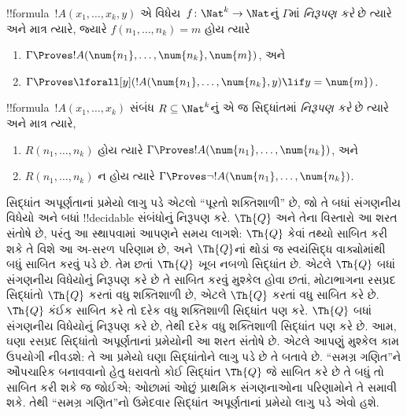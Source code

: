 \documentclass[../../../include/open-logic-section]{subfiles}
\begin{document}
\begin{defn}
!!{formula}~$!A(x_1, \dots, x_k, y)$ એ
વિધેય~$f\colon \Nat^k \to \Nat$નું
$\Gamma$માં \emph{નિરૂપણ કરે} છે
ત્યારે અને માત્ર ત્યારે, જ્યારે
$f(n_1, \dots, n_k)=m$ હોય ત્યારે
\begin{enumerate}
\item $\Gamma \Proves !A(\num{n_1}, \dots, \num{n_k}, \num{m})$, અને
\item $\Gamma \Proves \lforall[y](!A(\num{n_1}, \dots, \num{n_k},
y) \lif y = \num{m})$.
\end{enumerate}
\end{defn}

\begin{defn}
!!{formula}~$!A(x_1, \dots, x_k)$ સંબંધ
$R \subseteq \Nat^k$નું એ જ સિદ્ધાંતમાં
\emph{નિરૂપણ કરે}
છે ત્યારે અને માત્ર ત્યારે,
\begin{enumerate}
\item $R(n_1, \dots, n_k)$ હોય ત્યારે
  $\Gamma \Proves !A(\num{n_1},
\dots, \num{n_k})$, અને
\item $R(n_1, \dots, n_k)$ ન હોય ત્યારે
  $\Gamma \Proves \lnot
!A(\num{n_1}, \dots, \num{n_k})$.
\end{enumerate}
\end{defn}

સિદ્ધાંત અપૂર્ણતાનાં પ્રમેયો લાગુ પડે એટલો
``પૂરતો શક્તિશાળી'' છે, જો તે બધાં સંગણનીય
વિધેયો અને બધાં !!{decidable} સંબંધોનું
નિરૂપણ કરે. $\Th{Q}$ અને તેના
વિસ્તારો આ શરત સંતોષે છે, પરંતુ આ સ્થાપવામાં
આપણને સમય લાગશે: $\Th{Q}$ કેવાં તથ્યો
સાબિત કરી શકે તે વિશે આ અ-સરળ પરિણામ
છે, અને $\Th{Q}$નાં થોડાં જ સ્વયંસિદ્ધ વાક્યોમાંથી
બધું સાબિત કરવું પડે છે. તેમ છતાં
$\Th{Q}$ ખૂબ નબળો સિદ્ધાંત છે. એટલે
$\Th{Q}$ બધાં સંગણનીય વિધેયોનું
નિરૂપણ કરે છે તે સાબિત કરવું મુશ્કેલ
હોવા છતાં, મોટાભાગના રસપ્રદ સિદ્ધાંતો
$\Th{Q}$ કરતાં વધુ શક્તિશાળી છે, એટલે
$\Th{Q}$ કરતાં વધુ સાબિત કરે છે.
$\Th{Q}$ કંઈક સાબિત કરે તો દરેક વધુ
શક્તિશાળી સિદ્ધાંત પણ કરે. $\Th{Q}$
બધાં સંગણનીય વિધેયોનું નિરૂપણ કરે છે,
તેથી દરેક વધુ શક્તિશાળી સિદ્ધાંત પણ
કરે છે. આમ, ઘણા રસપ્રદ સિદ્ધાંતો
અપૂર્ણતાનાં પ્રમેયોની આ શરત સંતોષે છે.
એટલે આપણું મુશ્કેલ કામ ઉપયોગી નીવડશે:
તે આ પ્રમેયો ઘણા સિદ્ધાંતોને લાગુ પડે
છે તે બતાવે છે. ``સમગ્ર ગણિત''ને
ઔપચારિક બનાવવાનો હેતુ ધરાવતો કોઈ
સિદ્ધાંત $\Th{Q}$ જે સાબિત કરે છે
તે બધું તો સાબિત કરી શકે જ જોઈએ;
ઓછામાં ઓછું પ્રાથમિક સંગણનાઓના
પરિણામોને તે સમાવી શકે. તેથી
``સમગ્ર ગણિત''નો ઉમેદવાર સિદ્ધાંત
અપૂર્ણતાનાં પ્રમેયો લાગુ પડે એવો હશે.
\end{document}
